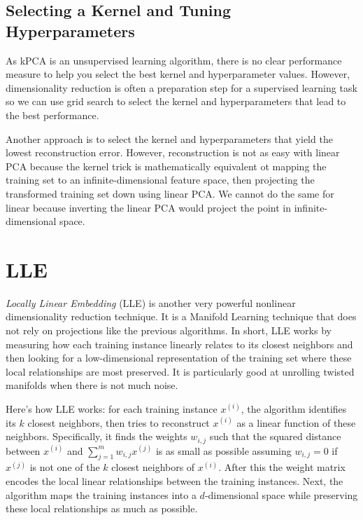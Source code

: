 \documentclass[letterpaper]{article}
\begin{document}
\subsection{Selecting a Kernel and Tuning Hyperparameters} 
As kPCA is an unsupervised learning algorithm, there is no clear performance measure to help you select the best kernel and hyperparameter values. However, dimensionality reduction is often a preparation step for a supervised learning task so we can use grid search to select the kernel and hyperparameters that lead to the best performance. 

Another approach is to select the kernel and hyperparameters that yield the lowest reconstruction error. However, reconstruction is not as easy with linear PCA because the kernel trick is mathematically equivalent ot mapping the training set to an infinite-dimensional feature space, then projecting the transformed training set down using linear PCA. We cannot do the same for linear because inverting the linear PCA would project the point in infinite-dimensional space. 

\section{LLE} 
\textsl{Locally Linear Embedding} (LLE) is another very powerful nonlinear dimensionality reduction technique. It is a Manifold Learning technique that does not rely on projections like the previous algorithms. In short, LLE works by measuring how each training instance linearly relates to its closest neighbors and then looking for a low-dimensional representation of the training set where these local relationships are most preserved. It is particularly good at unrolling twisted manifolds when there is not much noise. 

Here's how LLE works: for each training instance $x^{(i)}$, the algorithm identifies its $k$ closest neighbors, then tries to reconstruct $x^{(i)}$ as a linear function of these neighbors. Specifically, it finds the weights $w_{i,j}$ such that the squared distance between $x^{(i)}$ and $\sum_{j=1}^{m} w_{i, j}x^{(j)}$ is as small as possible assuming $w_{i, j} = 0$ if $x^{(j)}$ is not one of the $k$ closest neighbors of $x^{(i)}$. After this the weight matrix encodes the local linear relationships between the training instances. Next, the algorithm maps the training instances into a $d$-dimensional space while preserving these local relationships as much as possible. 
\end{document}
